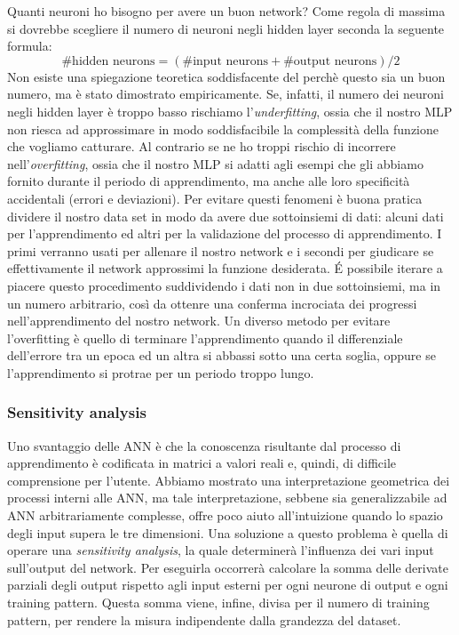 \documentclass[10pt,a4paper]{article}
\begin{document}
Quanti neuroni ho bisogno per avere un buon network? Come regola di massima si dovrebbe scegliere il numero di neuroni negli hidden layer seconda la seguente formula:
$$
\# \text{hidden neurons} = (\# \text{input neurons} + \# \text{output neurons})/2
$$
Non esiste una spiegazione teoretica soddisfacente del perchè questo sia un buon numero, ma è stato dimostrato empiricamente. Se, infatti, il numero dei neuroni negli hidden layer è troppo basso rischiamo l'\emph{underfitting}, ossia che il nostro MLP non riesca ad approssimare in modo soddisfacibile la complessità della funzione che vogliamo catturare. Al contrario se ne ho troppi rischio di incorrere nell'\emph{overfitting}, ossia che il nostro MLP si adatti agli esempi che gli abbiamo fornito durante il periodo di apprendimento, ma anche alle loro specificità accidentali (errori e deviazioni).
Per evitare questi fenomeni è buona pratica dividere il nostro data set in modo da avere due sottoinsiemi di dati: alcuni dati per l'apprendimento ed altri per la validazione del processo di apprendimento. I primi verranno usati per allenare il nostro network e i secondi per giudicare se effettivamente il network approssimi la funzione desiderata. \'E possibile iterare a piacere questo procedimento suddividendo i dati non in due sottoinsiemi, ma in un numero arbitrario, così da ottenre una conferma incrociata dei progressi nell'apprendimento del nostro network.
Un diverso metodo per evitare l'overfitting è quello di terminare l'apprendimento quando il differenziale dell'errore tra un epoca ed un altra si abbassi sotto una certa soglia, oppure se l'apprendimento si protrae per un periodo troppo lungo.

\subsubsection{Sensitivity analysis}

Uno svantaggio delle ANN è che la conoscenza risultante dal processo di apprendimento è codificata in matrici a valori reali e, quindi, di difficile comprensione per l'utente. Abbiamo mostrato una interpretazione geometrica dei processi interni alle ANN, ma tale interpretazione, sebbene sia generalizzabile ad ANN arbitrariamente complesse, offre poco aiuto all'intuizione quando lo spazio degli input supera le tre dimensioni. Una soluzione a questo problema è quella di operare una \emph{sensitivity analysis}, la quale determinerà l'influenza dei vari input sull'output del network. Per eseguirla occorrerà calcolare la somma delle derivate parziali degli output rispetto agli input esterni per ogni neurone di output e ogni training pattern. Questa somma viene, infine, divisa per il numero di training pattern, per rendere la misura indipendente dalla grandezza del dataset.
\end{document}

